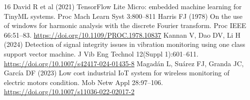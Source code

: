 \documentclass[10pt,twocolumn]{article}
\begin{document}
\begin{thebibliography}{16}
 David R et al (2021) TensorFlow Lite Micro: embedded machine learning for TinyML systems. Proc Mach Learn Syst 3:800--811
 Harris FJ (1978) On the use of windows for harmonic analysis with the discrete Fourier transform. Proc IEEE 66:51--83. \url{https://doi.org/10.1109/PROC.1978.10837}
 Kannan V, Dao DV, Li H (2024) Detection of signal integrity issues in vibration monitoring using one class support vector machine. J Vib Eng Technol 12(Suppl 1):601--611. \url{https://doi.org/10.1007/s42417-024-01435-8}
 Magadán L, Suárez FJ, Granda JC, García DF (2023) Low cost industrial IoT system for wireless monitoring of electric motors condition. Mob Netw Appl 28:97--106. \url{https://doi.org/10.1007/s11036-022-02017-2}
\end{thebibliography}
\end{document}
